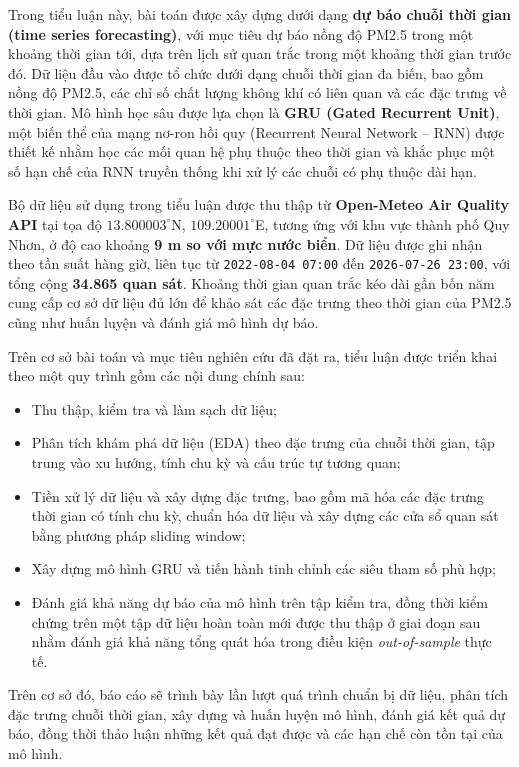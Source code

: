 \documentclass[12pt,oneside]{report}
\begin{document}
Trong tiểu luận này, bài toán được xây dựng dưới dạng \textbf{dự báo chuỗi thời gian (time series forecasting)}, với mục tiêu dự báo nồng độ PM2.5 trong một khoảng thời gian tới, dựa trên lịch sử quan trắc trong một khoảng thời gian trước đó. Dữ liệu đầu vào được tổ chức dưới dạng chuỗi thời gian đa biến, bao gồm nồng độ PM2.5, các chỉ số chất lượng không khí có liên quan và các đặc trưng về thời gian. Mô hình học sâu được lựa chọn là \textbf{GRU (Gated Recurrent Unit)}, một biến thể của mạng nơ-ron hồi quy (Recurrent Neural Network -- RNN) được thiết kế nhằm học các mối quan hệ phụ thuộc theo thời gian và khắc phục một số hạn chế của RNN truyền thống khi xử lý các chuỗi có phụ thuộc dài hạn.

Bộ dữ liệu sử dụng trong tiểu luận được thu thập từ \textbf{Open-Meteo Air Quality API} tại tọa độ $13.800003^\circ$N, $109.20001^\circ$E, tương ứng với khu vực thành phố Quy Nhơn, ở độ cao khoảng \textbf{9 m so với mực nước biển}. Dữ liệu được ghi nhận theo tần suất hàng giờ, liên tục từ \texttt{2022-08-04 07:00} đến \texttt{2026-07-26 23:00}, với tổng cộng \textbf{34.865 quan sát}. Khoảng thời gian quan trắc kéo dài gần bốn năm cung cấp cơ sở dữ liệu đủ lớn để khảo sát các đặc trưng theo thời gian của PM2.5 cũng như huấn luyện và đánh giá mô hình dự báo.

Trên cơ sở bài toán và mục tiêu nghiên cứu đã đặt ra, tiểu luận được triển khai theo một quy trình gồm các nội dung chính sau:

\begin{itemize}
\item Thu thập, kiểm tra và làm sạch dữ liệu;
\item Phân tích khám phá dữ liệu (EDA) theo đặc trưng của chuỗi thời gian, tập trung vào xu hướng, tính chu kỳ và cấu trúc tự tương quan;
\item Tiền xử lý dữ liệu và xây dựng đặc trưng, bao gồm mã hóa các đặc trưng thời gian có tính chu kỳ, chuẩn hóa dữ liệu và xây dựng các cửa sổ quan sát bằng phương pháp sliding window;
\item Xây dựng mô hình GRU và tiến hành tinh chỉnh các siêu tham số phù hợp;
\item Đánh giá khả năng dự báo của mô hình trên tập kiểm tra, đồng thời kiểm chứng trên một tập dữ liệu hoàn toàn mới được thu thập ở giai đoạn sau nhằm đánh giá khả năng tổng quát hóa trong điều kiện \textit{out-of-sample} thực tế.
\end{itemize}

Trên cơ sở đó, báo cáo sẽ trình bày lần lượt quá trình chuẩn bị dữ liệu, phân tích đặc trưng chuỗi thời gian, xây dựng và huấn luyện mô hình, đánh giá kết quả dự báo, đồng thời thảo luận những kết quả đạt được và các hạn chế còn tồn tại của mô hình.
\end{document}
